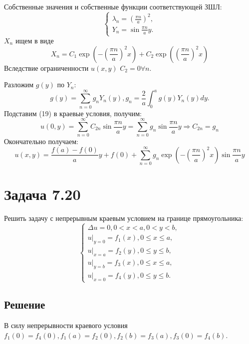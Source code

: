 \documentclass[11pt]{article}
\begin{document}
Собственные значения и собственные функции соответствующей ЗШЛ:
\begin{equation*}
\begin{cases}
\lambda_n = \left(\frac{\pi n}a\right)^2, \\
Y_n = \sin\frac{\pi n}ay.
\end{cases}
\end{equation*}
$X_n$ ищем в виде
\begin{equation}
X_n = C_1\exp\left(-\left(\frac{\pi n}a\right)^2x\right) + C_2\exp\left(\left(\frac{\pi n}a\right)^2x\right)
\end{equation}
Вследствие ограниченности $u(x, y)$ $C_2 = 0 \forall n$.

Разложим $g(y)$ по $Y_n$:
\begin{equation*}
g(y) = \sum_{n = 0}^{\infty}g_nY_n(y), g_n = \frac2a\int_0^ag(y)Y_n(y)dy.
\end{equation*}
Подставим (19) в краевые условия, получим:
\begin{equation*}
u(0, y) = \sum_{n = 0}^{\infty}C_{2n}\sin\frac{\pi n}ay = \sum_{n = 0}^{\infty}g_n\sin\frac{\pi n}ay
\Rightarrow C_{2n} = g_n
\end{equation*}
Окончательно получаем:
\begin{equation}
u(x, y) = \frac{f(a) - f(0)}ay + f(0) + \sum_{n = 0}^{\infty}g_n\exp\left(-\left(\frac{\pi n}a\right)^2x\right)\sin\frac{\pi n}ay
\end{equation}
\section{Задача 7.20}
\label{sec:org92883dc}
Решить задачу с непрерывным краевым условием на границе прямоугольника:
\begin{equation}
\begin{cases}
\Delta u = 0, 0 < x < a, 0 < y < b, \\
u|_{y = 0} = f_1(x), 0 \leq x \leq a, \\
u|_{x = a} = f_2(y), 0 \leq y \leq b, \\
u|_{y = b} = f_3(x), 0 \leq x \leq a, \\
u|_{x = 0} = f_4(y), 0 \leq y \leq b.
\end{cases}
\end{equation}
\subsection{Решение}
\label{sec:orge496ae7}
В силу непрерывности краевого условия $f_1(0) = f_4(0), f_1(a) = f_2(0), f_2(b) = f_3(a), f_3(0) = f_4(b)$.
\end{document}
